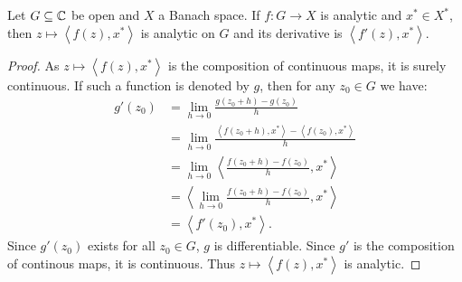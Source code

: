 \documentclass[reqno]{amsart}
\begin{document}
\begin{proposition}
	Let $G \subseteq \mathbb{C}$ be open and $X$ a Banach space. If $f:G \rightarrow X$ is analytic and $x^\ast \in X^\ast$, then $z \mapsto \left<f(z),x^\ast \right>$ is analytic on $G$ and its derivative is $\left<f'(z),x^\ast \right>$.	
\end{proposition}
	\begin{proof}
		As $z\mapsto \left<f(z),x^\ast \right>$ is the composition of continuous maps, it is surely continuous. If such a function is denoted by $g$, then for any $z_0 \in G$ we have:
		\begin{align*}
			g'(z_0)
			&= \lim_{h \rightarrow 0} \frac{g(z_0 + h) - g(z_0)}{h} \\
			&= \lim_{h \rightarrow 0} \frac{\left<f(z_0 + h),x^\ast \right> - \left<f(z_0),x^\ast \right>}{h} \\
			&= \lim_{h \rightarrow 0}\left<\frac{f(z_0 + h) - f(z_0)}{h},x^\ast \right> \\
			&= \left< \lim_{h \rightarrow 0}\frac{f(z_0 + h) - f(z_0)}{h} , x^\ast\right> \\
			&= \left<f'(z_0),x^\ast \right>.
		\end{align*}
		Since $g'(z_0)$ exists for all $z_0 \in G$, $g$ is differentiable. Since $g'$ is the composition of continous maps, it is continuous. Thus $z \mapsto \left<f(z), x^\ast \right>$ is analytic. 
	\end{proof}
\end{document}
